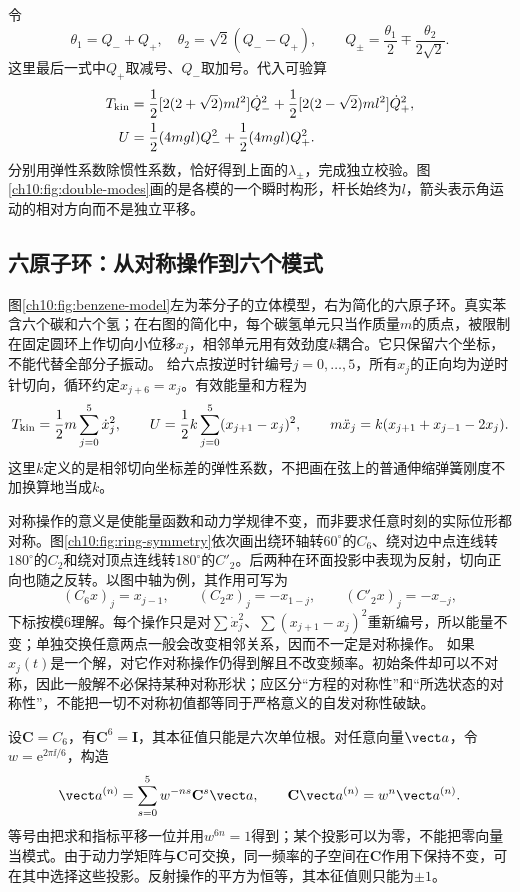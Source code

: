 令
\[
 \theta_1=Q_-+Q_+,\quad\theta_2=\sqrt2(Q_--Q_+),
 \qquad Q_\pm=\frac{\theta_1}{2}\mp\frac{\theta_2}{2\sqrt2}.
\]
这里最后一式中$Q_+$取减号、$Q_-$取加号。代入可验算
\begin{align*}
 T_{\rm kin}&=\frac12[2(2+\sqrt2)ml^2]\dot Q_-^2
 +\frac12[2(2-\sqrt2)ml^2]\dot Q_+^2,\\
 U&=\frac12(4mgl)Q_-^2+\frac12(4mgl)Q_+^2.
\end{align*}
分别用弹性系数除惯性系数，恰好得到上面的$\lambda_\pm$，完成独立校验。图\ref{ch10:fig:double-modes}画的是各模的一个瞬时构形，杆长始终为$l$，箭头表示角运动的相对方向而不是独立平移。
\chTenDoubleModesFigure

\subsection{六原子环：从对称操作到六个模式}
图\ref{ch10:fig:benzene-model}左为苯分子的立体模型，右为简化的六原子环。真实苯含六个碳和六个氢；在右图的简化中，每个碳氢单元只当作质量$m$的质点，被限制在固定圆环上作切向小位移$x_j$，相邻单元用有效劲度$k$耦合。它只保留六个坐标，不能代替全部分子振动。
\chTenBenzeneModelFigure
给六点按逆时针编号$j=0,\ldots,5$，所有$x_j$的正向均为逆时针切向，循环约定$x_{j+6}=x_j$。有效能量和方程为
\[
 T_{\rm kin}=\frac12m\sum_{j=0}^5\dot x_j^2,\qquad
 U=\frac12k\sum_{j=0}^5(x_{j+1}-x_j)^2,
 \qquad m\ddot x_j=k(x_{j+1}+x_{j-1}-2x_j).
\]
这里$k$定义的是相邻切向坐标差的弹性系数，不把画在弦上的普通伸缩弹簧刚度不加换算地当成$k$。

对称操作的意义是使能量函数和动力学规律不变，而非要求任意时刻的实际位形都对称。图\ref{ch10:fig:ring-symmetry}依次画出绕环轴转$60^\circ$的$C_6$、绕对边中点连线转$180^\circ$的$C_2$和绕对顶点连线转$180^\circ$的$C'_2$。后两种在环面投影中表现为反射，切向正向也随之反转。以图中轴为例，其作用可写为
\[
 (C_6x)_j=x_{j-1},\qquad (C_2x)_j=-x_{1-j},\qquad
 (C'_2x)_j=-x_{-j},
\]
下标按模6理解。每个操作只是对$\sum\dot x_j^2$、$\sum(x_{j+1}-x_j)^2$重新编号，所以能量不变；单独交换任意两点一般会改变相邻关系，因而不一定是对称操作。
\chTenRingSymmetryFigure
如果$x_j(t)$是一个解，对它作对称操作仍得到解且不改变频率。初始条件却可以不对称，因此一般解不必保持某种对称形状；应区分“方程的对称性”和“所选状态的对称性”，不能把一切不对称初值都等同于严格意义的自发对称性破缺。

设$\mathbf C=C_6$，有$\mathbf C^6=\mathbf I$，其本征值只能是六次单位根。对任意向量$\vect a$，令$w=\mathrm e^{2\pi\ii/6}$，构造
\[
 \vect a^{(n)}=\sum_{s=0}^5w^{-ns}\mathbf C^s\vect a,
 \qquad\mathbf C\vect a^{(n)}=w^n\vect a^{(n)}.
\]
等号由把求和指标平移一位并用$w^{6n}=1$得到；某个投影可以为零，不能把零向量当模式。由于动力学矩阵与$\mathbf C$可交换，同一频率的子空间在$\mathbf C$作用下保持不变，可在其中选择这些投影。反射操作的平方为恒等，其本征值则只能为$\pm1$。

